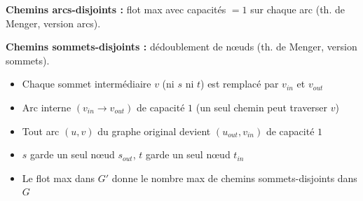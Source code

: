 \documentclass[12pt,a4paper]{article}
\begin{document}
\begin{methode}
\textbf{Chemins arcs-disjoints :} flot max avec capacit\'es $= 1$ sur chaque arc (th. de Menger, version arcs).

\textbf{Chemins sommets-disjoints :} d\'edoublement de n\oe uds (th. de Menger, version sommets).
\begin{itemize}[nosep]
    \item Chaque sommet interm\'ediaire $v$ (ni $s$ ni $t$) est remplac\'e par $v_{in}$ et $v_{out}$
    \item Arc interne $(v_{in} \to v_{out})$ de capacit\'e $1$ (un seul chemin peut traverser $v$)
    \item Tout arc $(u, v)$ du graphe original devient $(u_{out}, v_{in})$ de capacit\'e $1$
    \item $s$ garde un seul n\oe ud $s_{out}$, $t$ garde un seul n\oe ud $t_{in}$
    \item Le flot max dans $G'$ donne le nombre max de chemins sommets-disjoints dans $G$
\end{itemize}
\end{methode}
\end{document}
